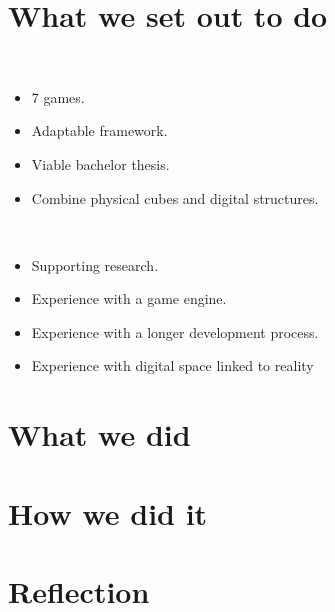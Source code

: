 \section{What we set out to do}

\begin{description}
	\item {}

	\item[Result goals]\ 
	\begin{itemize}
		\item 7 games.
		\item Adaptable framework.
		\item Viable bachelor thesis.
		\item Combine physical cubes and digital structures.
	\end{itemize}
	\item[Effect goals]\ 
	\begin{itemize}
		\item Supporting research.
		\item Experience with a game engine.
		\item Experience with a longer development process.
		\item Experience with digital space linked to reality
	\end{itemize}
\end{description}


\section{What we did}

\section{How we did it}

\section{Reflection}
